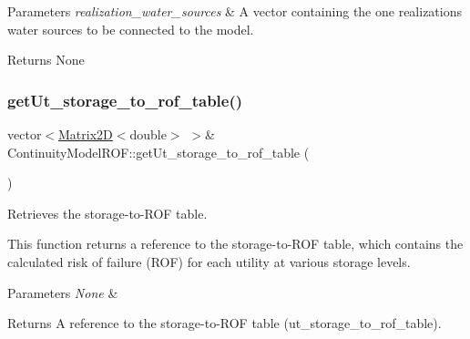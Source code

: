 \begin{DoxyParams}{Parameters}
{\em realization\+\_\+water\+\_\+sources} & A vector containing the one realization\textquotesingle{}s water sources to be connected to the model.\\
\hline
\end{DoxyParams}
\begin{DoxyReturn}{Returns}
None 
\end{DoxyReturn}
\mbox{\label{classContinuityModelROF_ad798adad5127a2674c5d4a3e8f24302d}} 
\subsubsection{\texorpdfstring{get\+Ut\+\_\+storage\+\_\+to\+\_\+rof\+\_\+table()}{getUt\_storage\_to\_rof\_table()}}
{\footnotesize\ttfamily vector$<$\mbox{\hyperlink{classMatrix2D}{Matrix2D}}$<$double$>$ $>$\& Continuity\+Model\+R\+O\+F\+::get\+Ut\+\_\+storage\+\_\+to\+\_\+rof\+\_\+table (\begin{DoxyParamCaption}{ }\end{DoxyParamCaption})}



Retrieves the storage-\/to-\/\+R\+OF table. 

This function returns a reference to the storage-\/to-\/\+R\+OF table, which contains the calculated risk of failure (R\+OF) for each utility at various storage levels.


\begin{DoxyParams}{Parameters}
{\em None} & \\
\hline
\end{DoxyParams}
\begin{DoxyReturn}{Returns}
A reference to the storage-\/to-\/\+R\+OF table ({\ttfamily ut\+\_\+storage\+\_\+to\+\_\+rof\+\_\+table}). 
\end{DoxyReturn}
\mbox{\label{classContinuityModelROF_a1bb8362ce39e694937a787805613e106}} 
